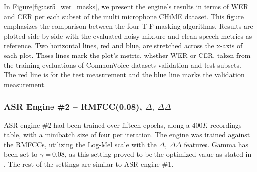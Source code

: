 In Figure\;\ref{fig:asr5_wer_masks}, we present the engine's
results in terms of WER and CER per each subset of
the multi microphone CHiME dataset.
This figure emphasizes the comparison between the
four T-F masking algorithms. Results are plotted side by side with
the evaluated noisy mixture and clean speech metrics as reference.
Two horizontal lines, red and blue, are stretched across the x-axis
of each plot. These lines mark the plot's metric, 
whether WER or CER, taken from the training evaluations of 
CommonVoice datasets validation and test subsets.
The red line is for the test measurement
and the blue line marks the validation measurement.

\subsubsection{ASR Engine \#2 -- RMFCC(0.08), \(\Delta,\;\Delta\Delta\)}
ASR engine \#2 had been trained over fifteen epochs,
along a \(400K\) recordings table, with a minibatch size 
of four per iteration. 
The engine was trained against the RMFCCs,
utilizing the Log-Mel scale with the \(\Delta,\;\Delta\Delta\) features.
Gamma has been set to
\(\gamma=0.08\), as this setting proved to be
the optimized value as stated in \cite{rmfcc1}.
The rest of the settings are similar to
ASR engine \#1. 
\bigskip

